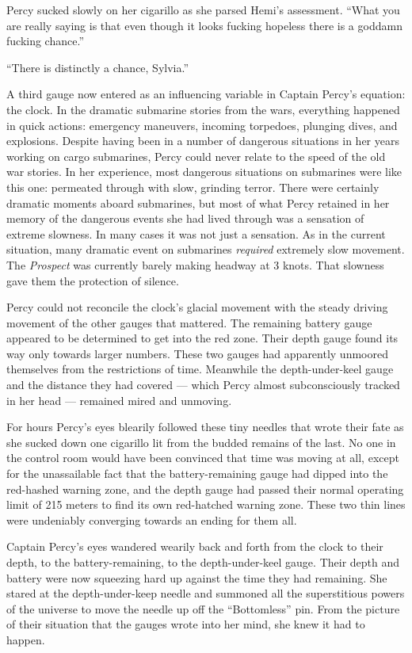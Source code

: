\documentclass[
]{scrbook}
\begin{document}
Percy sucked slowly on her cigarillo as she parsed Hemi's assessment.
``What you are really saying is that even though it looks fucking
hopeless there is a goddamn fucking chance.''

``There is distinctly a chance, Sylvia.''

A third gauge now entered as an influencing variable in Captain Percy's
equation: the clock. In the dramatic submarine stories from the wars,
everything happened in quick actions: emergency maneuvers, incoming
torpedoes, plunging dives, and explosions. Despite having been in a
number of dangerous situations in her years working on cargo submarines,
Percy could never relate to the speed of the old war stories. In her
experience, most dangerous situations on submarines were like this one:
permeated through with slow, grinding terror. There were certainly
dramatic moments aboard submarines, but most of what Percy retained in
her memory of the dangerous events she had lived through was a sensation
of extreme slowness. In many cases it was not just a sensation. As in
the current situation, many dramatic event on submarines \emph{required}
extremely slow movement. The \emph{Prospect} was currently barely making
headway at 3 knots. That slowness gave them the protection of silence.

Percy could not reconcile the clock's glacial movement with the steady
driving movement of the other gauges that mattered. The remaining
battery gauge appeared to be determined to get into the red zone. Their
depth gauge found its way only towards larger numbers. These two gauges
had apparently unmoored themselves from the restrictions of time.
Meanwhile the depth-under-keel gauge and the distance they had covered
--- which Percy almost subconsciously tracked in her head --- remained
mired and unmoving.

For hours Percy's eyes blearily followed these tiny needles that wrote
their fate as she sucked down one cigarillo lit from the budded remains
of the last. No one in the control room would have been convinced that
time was moving at all, except for the unassailable fact that the
battery-remaining gauge had dipped into the red-hashed warning zone, and
the depth gauge had passed their normal operating limit of 215 meters to
find its own red-hatched warning zone. These two thin lines were
undeniably converging towards an ending for them all.

Captain Percy's eyes wandered wearily back and forth from the clock to
their depth, to the battery-remaining, to the depth-under-keel gauge.
Their depth and battery were now squeezing hard up against the time they
had remaining. She stared at the depth-under-keep needle and summoned
all the superstitious powers of the universe to move the needle up off
the ``Bottomless'' pin. From the picture of their situation that the
gauges wrote into her mind, she knew it had to happen.
\end{document}
